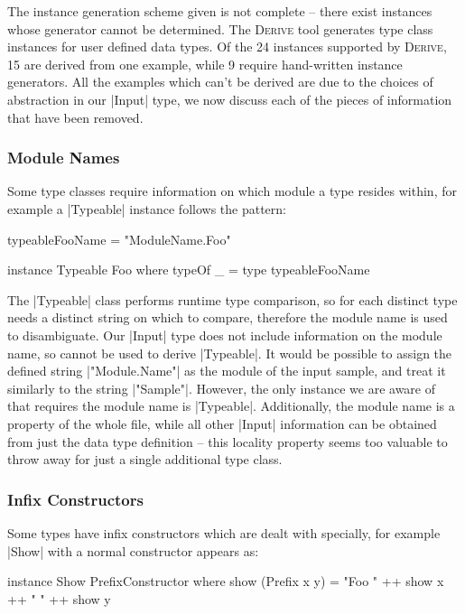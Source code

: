 \documentclass[preprint,draft]{sigplanconf}
\newcommand{\derive}{\textsc{Derive}}
\begin{document}
The instance generation scheme given is not complete -- there exist instances whose generator cannot be determined. The \derive{} tool \cite{derive} generates type class instances for user defined data types. Of the 24 instances supported by \derive{}, 15 are derived from one example, while 9 require hand-written instance generators. All the examples which can't be derived are due to the choices of abstraction in our |Input| type, we now discuss each of the pieces of information that have been removed.

\subsubsection{Module Names}
\label{sec:failure_typeable}

Some type classes require information on which module a type resides within, for example a |Typeable| instance \cite{typeable_syb1} follows the pattern:

\begin{code}
typeableFooName = "ModuleName.Foo"

instance Typeable Foo where
    typeOf _ = type typeableFooName
\end{code}

The |Typeable| class performs runtime type comparison, so for each distinct type needs a distinct string on which to compare, therefore the module name is used to disambiguate. Our |Input| type does not include information on the module name, so cannot be used to derive |Typeable|. It would be possible to assign the defined string |"Module.Name"| as the module of the input sample, and treat it similarly to the string |"Sample"|. However, the only instance we are aware of that requires the module name is |Typeable|. Additionally, the module name is a property of the whole file, while all other |Input| information can be obtained from just the data type definition -- this locality property seems too valuable to throw away for just a single additional type class.

\subsubsection{Infix Constructors}

Some types have infix constructors which are dealt with specially, for example |Show| with a normal constructor appears as:

\begin{code}
instance Show PrefixConstructor where
    show (Prefix x y) = "Foo " ++ show x ++ " " ++ show y
\end{code}
\end{document}
